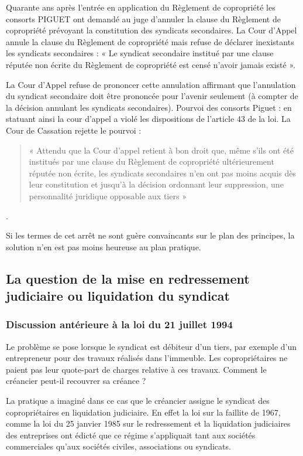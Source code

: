 		Quarante ans après l’entrée en application du Règlement de copropriété les consorts PIGUET ont demandé au juge d’annuler la clause du Règlement de copropriété prévoyant la constitution des syndicats secondaires. La Cour d’Appel annule la clause du Règlement de copropriété mais refuse de déclarer inexistants les syndicats secondaires : « Le syndicat secondaire institué par une clause réputée non écrite du Règlement de copropriété est censé n’avoir jamais existé ».
		
		La Cour d’Appel refuse de prononcer cette annulation affirmant que l’annulation du syndicat secondaire doit être prononcée pour l’avenir seulement (à compter de la décision annulant les syndicats secondaires). Pourvoi des consorts Piguet : en statuant ainsi la cour d’appel a violé les dispositions de l’article 43 de la loi. La Cour de Cassation rejette le pourvoi :
		\begin{quote}
			« Attendu que la Cour d’appel retient à bon droit que, même s’ils ont été institués par une clause du Règlement de copropriété ultérieurement réputée non écrite, les syndicats secondaires n’en ont pas moins acquis dès leur constitution et jusqu’à la décision ordonnant leur suppression, une personnalité juridique opposable aux tiers »
		\end{quote}.
		
		Si les termes de cet arrêt ne sont guère convaincants sur le plan des principes, la solution n’en est pas moins heureuse au plan pratique.
	
	\subsection{La question de la mise en redressement judiciaire ou liquidation du syndicat}
	
		\subsubsection{Discussion antérieure à la loi du 21 juillet 1994}
		
			Le problème se pose lorsque le syndicat est débiteur d'un tiers, par exemple d'un entrepreneur pour des travaux réalisés dans l'immeuble. Les copropriétaires ne paient pas leur quote-part de charges relative à ces travaux. Comment le créancier peut-il recouvrer sa créance ?

			La pratique a imaginé dans ce cas que le créancier assigne le syndicat des copropriétaires en liquidation judiciaire. En effet la loi sur la faillite de 1967, comme la loi du 25 janvier 1985 sur le redressement et la liquidation judiciaires des entreprises ont édicté que ce régime s'appliquait tant aux sociétés commerciales qu'aux sociétés civiles, associations ou syndicats.
			

